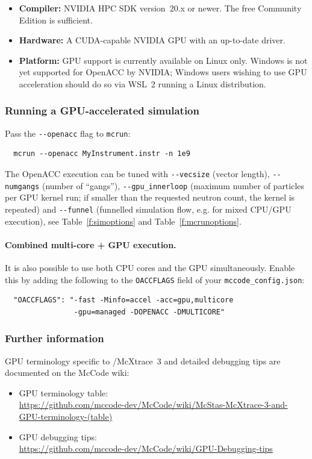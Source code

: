 \begin{itemize}
  \item \textbf{Compiler:} NVIDIA HPC SDK version~20.x or newer.  The
        free Community Edition is sufficient.
  \item \textbf{Hardware:} A CUDA-capable NVIDIA GPU with an up-to-date
        driver.
  \item \textbf{Platform:} GPU support is currently available on Linux
        only.  Windows is not yet supported for OpenACC by NVIDIA; Windows
        users wishing to use GPU acceleration should do so via
        WSL~2 running a Linux distribution.
\end{itemize}

\subsubsection{Running a GPU-accelerated simulation}

Pass the \verb+--openacc+ flag to \texttt{mcrun}:
\begin{verbatim}
  mcrun --openacc MyInstrument.instr -n 1e9
\end{verbatim}
The OpenACC execution can be tuned with \verb+--vecsize+ (vector length),
\verb+--numgangs+ (number of ``gangs''), \verb+--gpu_innerloop+ (maximum number
of particles per GPU kernel run; if smaller than the requested neutron count,
the kernel is repeated) and \verb+--funnel+ (funnelled simulation flow, e.g.
for mixed CPU/GPU execution), see Table~\ref{f:simoptions} and
Table~\ref{f:mcrunoptions}.

\paragraph{Combined multi-core + GPU execution.}
It is also possible to use both CPU cores and the GPU simultaneously.
Enable this by adding the following to the \texttt{OACCFLAGS} field of
your \texttt{mccode\_config.json}:
\begin{verbatim}
  "OACCFLAGS": "-fast -Minfo=accel -acc=gpu,multicore
                -gpu=managed -DOPENACC -DMULTICORE"
\end{verbatim}

\subsubsection{Further information}

GPU terminology specific to \MCS/McXtrace~3 and detailed debugging
tips are documented on the McCode wiki:
\begin{itemize}
  \item GPU terminology table:\\
    \url{https://github.com/mccode-dev/McCode/wiki/McStas-McXtrace-3-and-GPU-terminology-(table)}
  \item GPU debugging tips:\\
    \url{https://github.com/mccode-dev/McCode/wiki/GPU-Debugging-tips}
\end{itemize}



